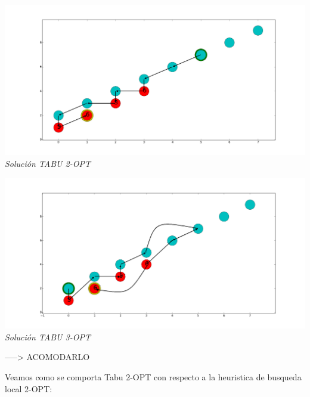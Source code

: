 \vspace*{0.3cm} \vspace*{0.3cm}
  \begin{center}
 \includegraphics[scale=0.3]{./EJ4/fam62opt.png}\\
 {            \textit{Soluci\'on TABU 2-OPT}}
  \end{center}
  \vspace*{0.3cm}

\vspace*{0.3cm} \vspace*{0.3cm}
  \begin{center}
 \includegraphics[scale=0.3]{./EJ4/fam63opt.png}\\
 {            \textit{Soluci\'on TABU 3-OPT}}
  \end{center}
  \vspace*{0.3cm}

-----> ACOMODARLO

Veamos como se comporta Tabu 2-OPT con respecto a la heuristica de busqueda local 2-OPT:

